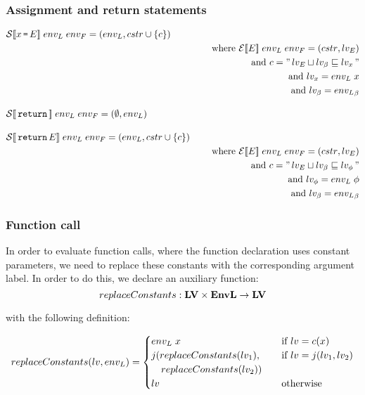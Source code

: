 \subsubsection{Assignment and return statements}
\begin{align*}
%
& \iS\dblSq{x \tk = E} \; \ienvL \; \ienvF = (\ienvL, \icstr \cup \{ c \}) \\
& \seWhere{\iE\dblSq{E} \; \ienvL \; \ienvF = (\icstr, \ilv_E)} \\
& \seAnd{c = \literal{\ilv_E \sqcup \ilv_\ib \sqsubseteq \ilv_x}} \\
& \seAnd{\ilv_x = \ienvL \; x} \\
& \seAnd{\ilv_\ib = \ienvL_\ib} \seSpace
%
& \iS\dblSq{\tk{return}} \; \ienvL \; \ienvF = (\emptyset, \ienvL) \seSpace
%
& \iS\dblSq{\tk{return} E} \; \ienvL \; \ienvF = (\ienvL, \icstr \cup \{ c \}) \\
& \seWhere{\iE\dblSq{E} \; \ienvL \; \ienvF = (\icstr, \ilv_E)} \\
& \seAnd{c = \literal{\ilv_E \sqcup \ilv_\ib \sqsubseteq \ilv_\ifb}} \\
& \seAnd{\ilv_\ifb = \ienvL \; \ifb} \\
& \seAnd{\ilv_\ib = \ienvL_\ib}
\end{align*}

\subsubsection{Function call}
In order to evaluate function calls, where the function declaration uses constant parameters, we need to replace these constants with the corresponding argument label.
In order to do this, we declare an auxiliary function:
\[ replaceConstants : \mathbf{LV} \times \mathbf{EnvL} \rightarrow \mathbf{LV} \]

with the following definition:

\[replaceConstants(lv, {env_L}) = \begin{cases}
  {env_L} \; x & \quad \text{if } lv = c(x) \\
  j(replaceConstants(lv_1), & \quad \text{if } lv = j(lv_1, lv_2) \\
  \quad replaceConstants(lv_2)) & \\
  lv & \quad \text{otherwise}
\end{cases} \]

